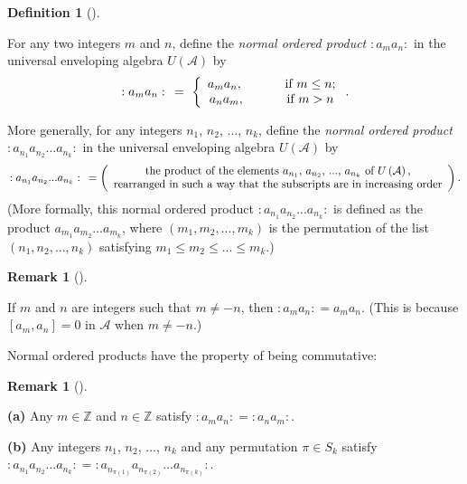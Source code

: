 \documentclass
[numbers=enddot,12pt,final,onecolumn,german,notitlepage]{scrartcl}%
\theoremstyle{definition}
\newtheorem{defi}[theo]{Definition}
\newenvironment{definition}[1][]
{\begin{defi}[#1]\begin{leftbar}}
{\end{leftbar}\end{defi}}
\newtheorem{remk}[theo]{Remark}
\newenvironment{remark}[1][]
{\begin{remk}[#1]\begin{leftbar}}
{\end{leftbar}\end{remk}}
\begin{document}
\begin{definition}
\label{def.fockvir.normal}For any two integers $m$ and $n$, define the
\textit{normal ordered product }$\left.  :a_{m}a_{n}:\right.  $ in the
universal enveloping algebra $U\left(  \mathcal{A}\right)  $ by\textit{ }%
\[
\left.  :a_{m}a_{n}:\right.  \ =\ \left\{
\begin{array}
[c]{c}%
a_{m}a_{n},\ \ \ \ \ \ \ \ \ \ \text{if }m\leq n;\\
a_{n}a_{m},\ \ \ \ \ \ \ \ \ \ \text{if }m>n
\end{array}
\right.  .
\]


More generally, for any integers $n_{1}$, $n_{2}$, $...$, $n_{k}$, define the
\textit{normal ordered product }$\left.  :a_{n_{1}}a_{n_{2}}...a_{n_{k}%
}:\right.  $ in the universal enveloping algebra $U\left(  \mathcal{A}\right)
$ by%
\[
\left.  :a_{n_{1}}a_{n_{2}}...a_{n_{k}}:\right.  \ =\left(
\begin{array}
[c]{c}%
\text{the product of the elements }a_{n_{1}}\text{, }a_{n_{2}}\text{,
}...\text{, }a_{n_{k}}\text{ of }U\left(  \mathcal{A}\right)  \text{,}\\
\text{rearranged in such a way that the subscripts are in increasing order}%
\end{array}
\right)  .
\]
(More formally, this normal ordered product $\left.  :a_{n_{1}}a_{n_{2}%
}...a_{n_{k}}:\right.  $ is defined as the product $a_{m_{1}}a_{m_{2}%
}...a_{m_{k}}$, where $\left(  m_{1},m_{2},...,m_{k}\right)  $ is the
permutation of the list $\left(  n_{1},n_{2},...,n_{k}\right)  $ satisfying
$m_{1}\leq m_{2}\leq...\leq m_{k}$.)
\end{definition}

\begin{remark}
\label{rmk.fockvir.normal.mn}If $m$ and $n$ are integers such that $m\neq-n$,
then $\left.  :a_{m}a_{n}:\right.  =a_{m}a_{n}$. (This is because $\left[
a_{m},a_{n}\right]  =0$ in $\mathcal{A}$ when $m\neq-n$.)
\end{remark}

Normal ordered products have the property of being commutative:

\begin{remark}
\label{rmk.fockvir.normal.comm}\textbf{(a)} Any $m\in\mathbb{Z}$ and
$n\in\mathbb{Z}$ satisfy $\left.  :a_{m}a_{n}:\right.  =\left.  :a_{n}%
a_{m}:\right.  $.

\textbf{(b)} Any integers $n_{1}$, $n_{2}$, $...$, $n_{k}$ and any permutation
$\pi\in S_{k}$ satisfy $\left.  :a_{n_{1}}a_{n_{2}}...a_{n_{k}}:\right.
=\left.  :a_{n_{\pi\left(  1\right)  }}a_{n_{\pi\left(  2\right)  }%
}...a_{n_{\pi\left(  k\right)  }}:\right.  $.
\end{remark}
\end{document}
